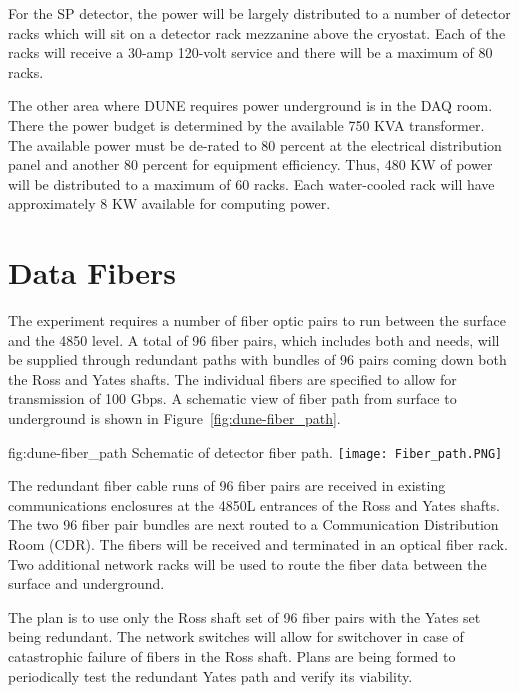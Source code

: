 For the SP detector, the power will be largely distributed to a number
of detector racks which will sit on a detector rack mezzanine above
the cryostat.  Each of the racks will receive a 30-amp 120-volt
service and there will be a maximum of 80 racks.

The other area where DUNE requires power underground is in the DAQ
room.  There the power budget is determined by the available 750 KVA
transformer.  The available power must be de-rated to 80 percent at
the electrical distribution panel and another 80 percent for equipment
efficiency.  Thus, 480 KW of power will be distributed to a maximum of
60 racks.  Each water-cooled rack will have approximately 8 KW
available for computing power.


\section{Data Fibers}
\label{sec:fdsp-coord-faci-fibers}


The  experiment requires a number of fiber optic pairs to
run between the surface and the 4850 level.  A total of 96 fiber
pairs, which includes both  and  needs, will
be supplied through redundant paths with bundles of 96 pairs coming
down both the Ross and Yates shafts.  The individual fibers are
specified to allow for transmission of 100 Gbps.  A schematic view of
fiber path from surface to underground is shown in
Figure~\ref{fig:dune-fiber_path}.
\begin{dunefigure}{fig:dune-fiber_path}
  {Schematic of detector fiber path.}
  \texttt{[image: Fiber\_path.PNG]}
\end{dunefigure}

The redundant fiber cable runs of 96 fiber pairs are received in
existing communications enclosures at the 4850L entrances of the Ross
and Yates shafts.  The two 96 fiber pair bundles are next routed to a
Communication Distribution Room (CDR).  The fibers will be received
and terminated in an optical fiber rack. Two additional network racks
will be used to route the fiber data between the surface and
underground.

The plan is to use only the Ross shaft set of 96 fiber pairs with the
Yates set being redundant.  The network switches will allow for
switchover in case of catastrophic failure of fibers in the Ross
shaft.  Plans are being formed to periodically test the redundant
Yates path and verify its viability.

